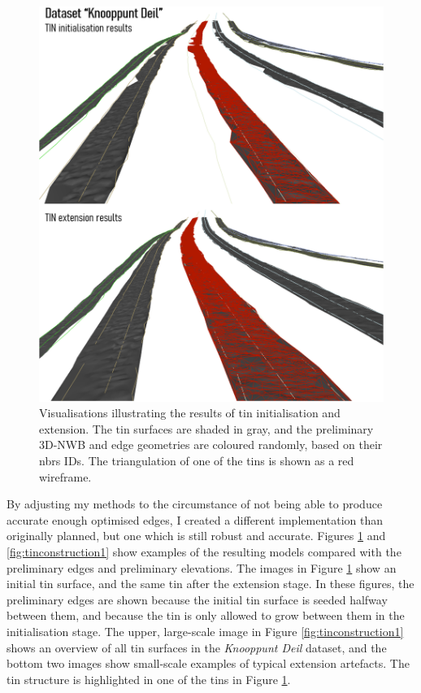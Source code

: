 \begin{figure}
    \centering
    \includegraphics[width=\linewidth]{final_report/figs/tinconstruction0.png}
    \caption[Renders illustrating the results of TIN initialisation and extension]{Visualisations illustrating the results of \ac{tin} initialisation and extension. The \ac{tin} surfaces are shaded in gray, and the preliminary 3D-NWB and edge geometries are coloured randomly, based on their \ac{nbrs} IDs. The triangulation of one of the \ac{tin}s is shown as a red wireframe.}
    \label{fig:tinconstruction0}
\end{figure}

By adjusting my methods to the circumstance of not being able to produce accurate enough optimised edges, I created a different implementation than originally planned, but one which is still robust and accurate. Figures \ref{fig:tinconstruction0} and \ref{fig:tinconstruction1} show examples of the resulting models compared with the preliminary edges and preliminary elevations. The images in Figure \ref{fig:tinconstruction0} show an initial \ac{tin} surface, and the same \ac{tin} after the extension stage. In these figures, the preliminary edges are shown because the initial \ac{tin} surface is seeded halfway between them, and because the \ac{tin} is only allowed to grow between them in the initialisation stage. The upper, large-scale image in Figure \ref{fig:tinconstruction1} shows an overview of all \ac{tin} surfaces in the \textit{Knooppunt Deil} dataset, and the bottom two images show small-scale examples of typical extension artefacts. The \ac{tin} structure is highlighted in one of the \ac{tin}s in Figure \ref{fig:tinconstruction0}.

